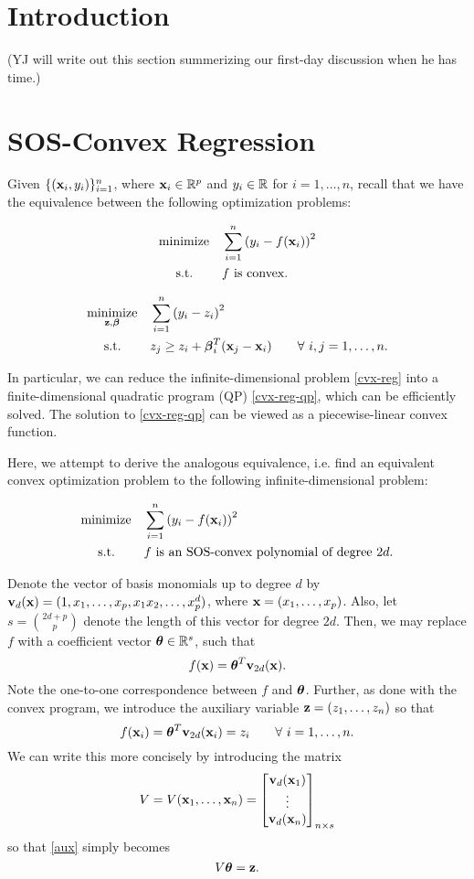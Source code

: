 \documentclass[11pt]{article}
\newcommand{\optprob}[5]
{
	\begin{equation}\label{#5}
	\begin{aligned}
	& \underset{#2}{\text{#1}}
	& & #3 \\
	& \text{\quad\ s.t.}
	& & #4
	\end{aligned}
	\end{equation}
}
\begin{document}

\section{Introduction}

(YJ will write out this section summerizing our first-day discussion when he has time.)

\clearpage

\section{SOS-Convex Regression}

Given $\{({\bf x}_i, y_i)\}_{i=1}^n$, where ${\bf x}_i \in {\mathbb R}^p$ and $y_i \in {\mathbb R}$ for $i = 1, \dotsc, n$, recall that we have the equivalence between the following optimization problems:

\optprob{minimize}{}{\sum_{i=1}^n\inparen{y_i - f(\bfx_i)}^2}{\text{$f$ is convex.}}{cvx-reg}

\optprob{minimize}{\bfz, \bfbeta}{\sum_{i=1}^n\inparen{y_i - z_i}^2}{z_j \geq z_i + \bfbeta_i^T(\bfx_j - \bfx_i) \qquad\forall\ i, j = 1, \dotsc, n.}{cvx-reg-qp}

In particular, we can reduce the infinite-dimensional problem \eqref{cvx-reg} into a finite-dimensional quadratic program (QP) \eqref{cvx-reg-qp}, which can be efficiently solved. The solution to \eqref{cvx-reg-qp} can be viewed as a piecewise-linear convex function. 

Here, we attempt to derive the analogous equivalence, i.e. find an equivalent convex optimization problem to the following infinite-dimensional problem:
\optprob{minimize}{}{\sum_{i=1}^n\inparen{y_i - f(\bfx_i)}^2}{\text{$f$ is an SOS-convex polynomial of degree $2d$.}}{sos-reg}

Denote the vector of basis monomials up to degree $d$ by ${\bf v}_d({\bf x}) = (1, x_1, \dotsc, x_p, x_1x_2, \dotsc, x_p^d)$, where ${\bf x} = (x_1, \dotsc, x_p)$. Also, let $s = {2d + p \choose p}$ denote the length of this vector for degree $2d$. Then, we may replace $f$ with a coefficient vector ${\boldsymbol\theta} \in {\mathbb R}^s$, such that
\[
f({\bf x}) = {\boldsymbol\theta}^T{\bf v}_{2d}({\bf x}).
\]
Note the one-to-one correspondence between $f$ and ${\boldsymbol\theta}$. Further, as done with the convex program, we introduce the auxiliary variable ${\bf z} = (z_1, \dotsc, z_n)$ so that 
\begin{equation}\label{aux}
f({\bf x}_i) = {\boldsymbol\theta}^T{\bf v}_{2d}({\bf x}_i) = z_i \qquad\forall\ i = 1, \dotsc, n.
\end{equation}
We can write this more concisely by introducing the matrix
\[
V = V({\bf x}_1, \dotsc, {\bf x}_n) = \begin{bmatrix}
{\bf v}_d({\bf x}_1) \\
\vdots \\
{\bf v}_d({\bf x}_n)
\end{bmatrix}_{n \times s}
\]
so that \eqref{aux} simply becomes
\begin{equation}\label{sos-poly}
V{\boldsymbol\theta} = {\bf z}.
\end{equation}
\end{document}
